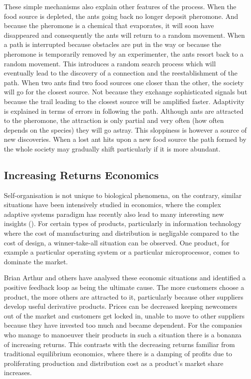 These simple mechanisms also explain other features of the process. 
When the food source is depleted, the ants going 
back no longer deposit pheromone. And because the pheromone is 
a chemical that evaporates, it will soon have disappeared and consequently 
the ants will return to a random movement. When a path 
is interrupted because obstacles
are put in the way or because the pheromone is temporarily removed by 
an experimenter, the ants resort back to a random movement. This introduces
a random search process 
which will eventually lead to the discovery of a connection and the 
reestablishment of the path. When two ants find two food sources one closer
than the other, the society will go for the closest source. Not because they 
exchange sophisticated signals but because the trail leading to the 
closest source will be amplified faster. Adaptivity is explained in 
terms of errors in following the path. Although ants are attracted 
to the pheromone, the attraction is only partial and 
very often (how often depends on the species)
they will go astray. This sloppiness is however a source of new discoveries. 
When a lost ant hits upon a new food source
the path formed by the whole society may gradually shift
particularly if it is more abundant.

\subsection{Increasing Returns Economics}

Self-organisation is not unique to biological phenomena,
on the contrary, similar situations have been intensively
studied in economics, where
the complex adaptive systems paradigm has recently also 
lead to many interesting new insights (\cite{Arthur:1996}). 
For certain types of products, particularly in 
information technology where the cost of manufacturing 
and distribution is negligable compared to the cost
of design, a winner-take-all situation can be observed. 
One product, for example a particular operating system or 
a particular microprocessor, comes to dominate the market. 

Brian Arthur and others have analysed these economic situations 
and identified a positive feedback loop as being the ultimate cause.
The more customers choose a product, the more 
others are attracted to it, particularly because 
other suppliers develop useful derivative products. Prices can 
be decreased keeping newcomers out of the market and 
customers get locked in, unable to move to other suppliers
because they have invested too much and became dependent. 
For the companies who manage to manoeuver their products
in such a situation there is a bonanza of increasing returns. 
This contrasts with the decreasing returns familiar 
from traditional equilibrium economics, where there is 
a damping of profits due to proliferating production and 
distribution cost as a product's market share increases. 


